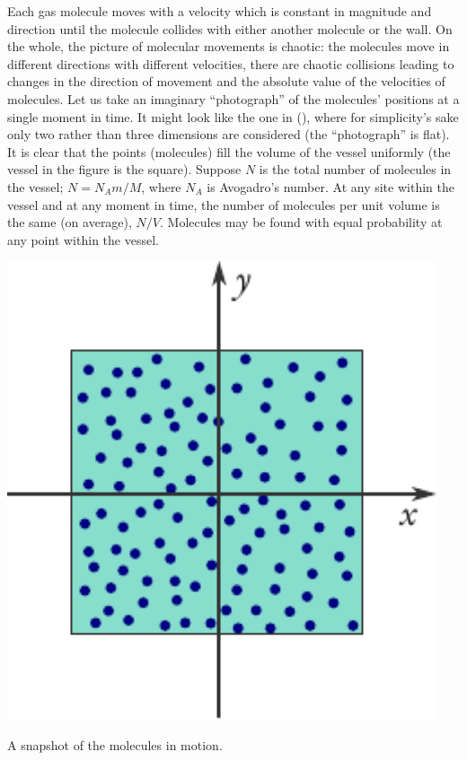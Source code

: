 Each gas molecule moves with a velocity which is constant in magnitude and direction until the molecule collides with either another molecule or the wall. On the whole, the picture of molecular movements is chaotic: the molecules move in different directions with different velocities, there are chaotic collisions leading to changes in the direction of movement and the absolute value of the velocities of molecules. Let us take an imaginary ``photograph'' of the molecules' positions at a single moment in time. It might look like the one in (), where for simplicity's sake only two rather than three dimensions are considered (the ``photograph'' is flat). It is clear that the points (molecules) fill the volume of the vessel uniformly (the vessel in the figure is the square). Suppose $N$ is the total number of molecules in the vessel; $N=N_{A}m /M$, where $N_{A}$ is Avogadro's number. At any site within the vessel and at any moment in time, the number of molecules per unit volume is the same (on average), $N/V$. Molecules may be found with equal probability at any point within the vessel.
\begin{marginfigure}%
\centering
\includegraphics[width=0.95\textwidth]{figures/mol-photo.pdf}
\caption{A snapshot of the molecules in motion.\label{mol-photo}}
\end{marginfigure}

